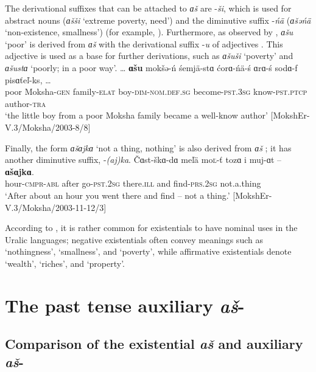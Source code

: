 \documentclass[output=paper,colorlinks,citecolor=brown,draft,draftmode]{langscibook}
\begin{document}
  The derivational suffixes that can be attached to \textit{ɑš} are -\textit{ši}, which is used for abstract nouns (\textit{ɑšši} `extreme poverty, need') and the diminutive suffix -\textit{ńä} (\textit{ɑšəńä} `non-existence, smallness') (for example, \citealt[73]{MWb}). Furthermore, as observed by \citet[79]{Bartens1996}, \textit{ɑšu} `poor' is derived from \textit{ɑš} with the derivational suffix -\textit{u} of adjectives . This adjective is used as a base for further derivations, such as \textit{ɑšuši} `poverty' and \textit{ɑšustɑ} `poorly; in a poor way'.
\ea\label{ex:moksha-poor}
\gll \ob\ldots{\cb} \textbf{ɑšu} mokšə-ń śemjä-stɑ ćorɑ-ńä-ś
ɑrɑ-ś sodɑ-f pisɑťeľ-ks, \ob\ldots{\cb}\\
{} poor Moksha-\textsc{gen} family-\textsc{elat} boy-\textsc{dim-nom.def.sg} become-\textsc{pst.3sg} know-\textsc{pst.ptcp} author-\textsc{tra}\\
\glt `the little boy from a poor Moksha family became a well-know author' [MokshEr-V.3/Moksha/2003-8/8]
\z

  Finally, the form \textit{ɑšɑjkɑ} `not a thing, nothing' \citep[51]{MRV} is also derived from \textit{ɑš} ; it has another diminutive suffix, -\textit{(aj)ka}.
\ea\label{ex:moksha-find}
\gll Čɑst-škɑ-dɑ meľä mo\textsc{ľ}-ť tozɑ i muj-ɑt -- \textbf{ɑšɑjkɑ}.\\
hour-\textsc{cmpr-abl} after go-\textsc{pst.2sg} there.\textsc{ill} and find-\textsc{prs.2sg} {} not.a.thing\\
\glt `After about an hour you went there and find -- not a thing.' [MokshEr-V.3/Moksha/2003-11-12/3]
\z

  According to \citet[in passim]{Bartens1996}, it is rather common for existentials to have nominal uses in the Uralic languages; negative existentials often convey meanings such as `nothingness', `smallness', and `poverty', while affirmative existentials denote `wealth', `riches', and `property'.

\section{The past tense auxiliary \textit{aš}-}\label{sec:2:6}

\subsection{Comparison of the existential \textit{aš} and auxiliary \textit{aš}-}\label{sec:2:6.1}
\end{document}
